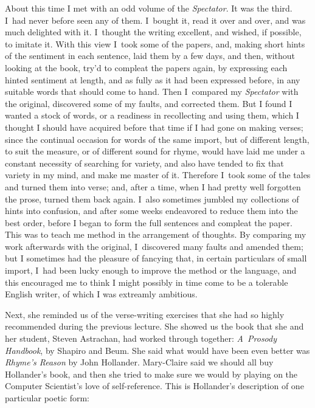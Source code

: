 {   About this time I met with an odd volume of the
{\sl Spectator}.  It was the third.  I~had never before seen
   any of them.  I~bought it, read it over and over, and was
   much delighted with it.  I~thought the writing excellent,
   and wished, if possible, to imitate it.  With this view 
I~took some of the papers, and, making short hints of the
   sentiment in each sentence, laid them by a few days, and
   then, without looking at the book, try'd to compleat the
   papers again, by expressing each hinted sentiment at
   length, and as fully as it had been expressed before, in
   any suitable words that should come to hand.  Then 
 I~compared my {\sl Spectator\/} with the original, discovered some
   of my faults, and corrected them.  But I found I wanted a
   stock of words, or a readiness in recollecting and using
   them, which I thought I should have acquired before that
   time if I had gone on making verses; since the continual
   occasion for words of the same import, but of different
   length, to suit the measure, or of different sound for
   rhyme, would have laid me under a constant necessity of
   searching for variety, and also have tended to fix that
   variety in my mind, and make me master of it.  Therefore 
 I~took some of the tales and turned them into verse; and,
   after a time, when I had pretty well forgotten the prose,
   turned them back again.  I~also sometimes jumbled my
   collections of hints into confusion, and after some weeks
   endeavored to reduce them into the best order, before I
   began to form the full sentences and compleat the paper.
   This was to teach me method in the arrangement of thoughts.
   By comparing my work afterwards with the original, 
 I~discovered many faults and amended them; but I sometimes
   had the pleasure of fancying that, in certain particulars
   of small import, I~had been lucky enough to improve the
   method or the language, and this encouraged me to think I
   might possibly in time come to be a tolerable English
   writer, of which I was extreamly ambitious.
\smallskip}

Next, she reminded us of the verse-writing exercises that she had so
highly recommended during the previous lecture.  She showed us the book
that she and her student, Steven Astrachan, had worked through together:
{\sl A~Prosody Handbook}, by Shapiro and Beum.  She said what would have been
even better was {\sl Rhyme's Reason\/} by John Hollander.
Mary-Claire said we
should all buy Hollander's book, and then she tried to make sure we would
by playing on the Computer Scientist's love of self-reference. This is
Hollander's description of one particular poetic form:

